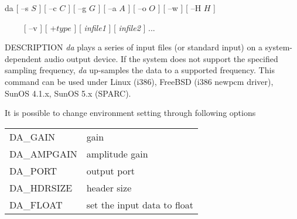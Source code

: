 \hypertarget{da}{}
\begin{synopsis}
\item [da] [ --s $S$ ] [ --c $C$ ] [ --g $G$ ] [ --a $A$ ] [ --o $O$ ] 
	   [ --w ] [ --H $H$ ]
\item [\ ~~~] [ --v ] [ +$type$ ] [ {\em infile1} ] [ {\em infile2} ] ...
\end{synopsis}

\begin{qsection}{DESCRIPTION}
{\em da} plays a series of input files (or standard input) 
on a system-dependent audio output device.
If the system does not support the specified sampling frequency, 
{\em da} up-samples the data to a supported frequency.
This command can be used under
Linux (i386), FreeBSD (i386 newpcm driver), SunOS 4.1.x, SunOS 5.x (SPARC).
 
It is possible to change environment setting through following options

\begin{tabular}{ll}
DA\_GAIN & gain\\
DA\_AMPGAIN & amplitude gain\\
DA\_PORT & output port\\
DA\_HDRSIZE & header size\\
DA\_FLOAT & set the input data to float\\
\end{tabular}

\end{qsection}

